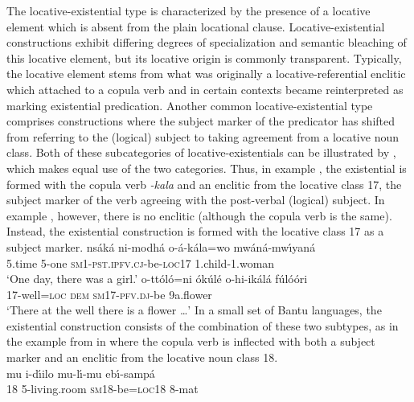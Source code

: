 \documentclass[output=paper]{langsci/langscibook}
\begin{document}
The locative-existential type is characterized by the presence of a
locative element which is absent from the plain locational clause.
Locative-existential constructions exhibit differing degrees of
specialization and semantic bleaching of this locative element, but its
locative origin is commonly transparent. Typically, the locative element
stems from what was originally a locative-referential enclitic which
attached to a copula verb and in certain contexts became reinterpreted as
marking existential predication. Another common locative-existential type comprises constructions where the subject marker of the predicator has shifted from referring to the (logical) subject to taking agreement from a locative noun class. Both of these subcategories of locative-existentials can be illustrated by , which makes equal use of the two categories. Thus, in example , the existential is formed with the copula verb \textit{-kala} and an enclitic from the locative class 17, the subject marker of the verb agreeing with the post-verbal (logical) subject. In example , however, there is no enclitic (although the copula verb is the same). Instead, the existential construction is formed with the locative class 17 as a subject marker.
\ea\label{ex:cuwabo-girl-flower}
\ea\label{ex:cuwabo-girl}
\gll ns{\'a}k\'a ni-modh\'a o-{\'a}-k{\'a}la=wo mw{\'a}n{\'a}-mw{\'\i}yan\'a\\
	5.time 5-one \textsc{sm}1-\textsc{pst.ipfv.cj}-be-\textsc{loc}17 1.child-1.woman\\
\glt `One day, there was a girl.'
\ex\label{ex:cuwabo-flower}
\gll o-tt{\'o}l{\'o}=ni {\'o}k{\'u}l\'e o-hi-ik{\'a}l\'a f{\'u}l{\'o}{\'o}ri\\
	17-well=\textsc{loc} \textsc{dem} \textsc{sm}17-\textsc{pfv.dj}-be   9a.flower\\
\glt `There at the well there is a flower \ldots{}'
\z\z
In a small set of Bantu languages, the existential construction consists of the combination of these two subtypes, as in the example from  in  where the copula verb is inflected with both a subject marker and an enclitic from the locative noun class 18.
\ea\label{ex:lusoga-livingroom}
\\
\gll mu i-d{\'\i}ilo mu-l{\'\i}-mu eb{\'\i}-samp\'a\\
	18 5-living.room \textsc{sm}18-be=\textsc{loc}18 8-mat\\
\end{document}
